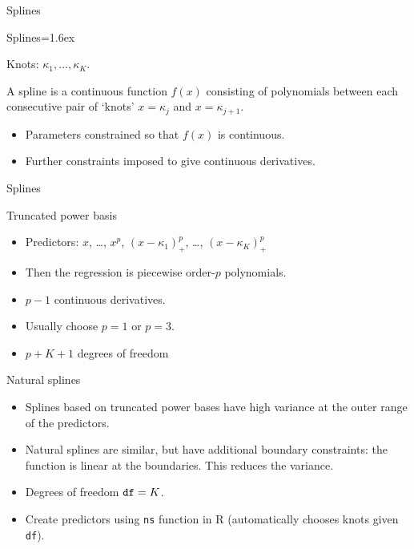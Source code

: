 \documentclass[14pt]{beamer}
\makeatletter
\def\biz{\begin{itemize}[<+-| alert@+>]}
\def\eiz{\end{itemize}}
\makeatother
\begin{document}
\begin{frame}{Splines}
\end{frame}
 
\begin{frame}{Splines}\parskip=1.6ex

Knots: $\kappa_1,\dots,\kappa_K$.

\pause

A spline is a continuous function $f(x)$ consisting of polynomials between each
consecutive pair of `knots' $x=\kappa_j$ and $x=\kappa_{j+1}$.

\pause

\begin{itemize}
\item Parameters constrained so that $f(x)$ is continuous.

\item Further constraints imposed to give continuous derivatives.
\end{itemize}
\end{frame}


\begin{frame}{Splines}

\end{frame}



\begin{frame}{Truncated power basis}
\biz

\item Predictors: $x$, \dots, $x^p$, $(x-\kappa_{1})_+^p$, \dots, $(x-\kappa_{K})_+^p$

\item Then the regression is piecewise order-$p$ polynomials.
\item $p-1$ continuous derivatives.
\item Usually choose $p=1$ or $p=3$.

\item $p+K+1$ degrees of freedom
\eiz
\end{frame}


\begin{frame}[fragile]{Natural splines}

\begin{itemize}
\item 
Splines based on truncated power bases have high variance at the outer range of the predictors.
\item Natural splines are similar, but have additional \alert{boundary constraints}: the function is linear at the boundaries. This reduces the variance.

\item Degrees of freedom $\verb|df|=K$.

\item Create predictors using \verb|ns| function in R (automatically chooses knots given \verb|df|).


\end{itemize}

\end{frame}
\end{document}

